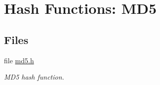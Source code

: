 \hypertarget{group__HASH__md5__m}{
\section{Hash Functions: MD5}
\label{group__HASH__md5__m}
}
\subsection*{Files}
\begin{CompactItemize}
\item 
file \hyperlink{md5_8h}{md5.h}
\begin{CompactList}\small\item\em MD5 hash function. \item\end{CompactList}

\end{CompactItemize}
